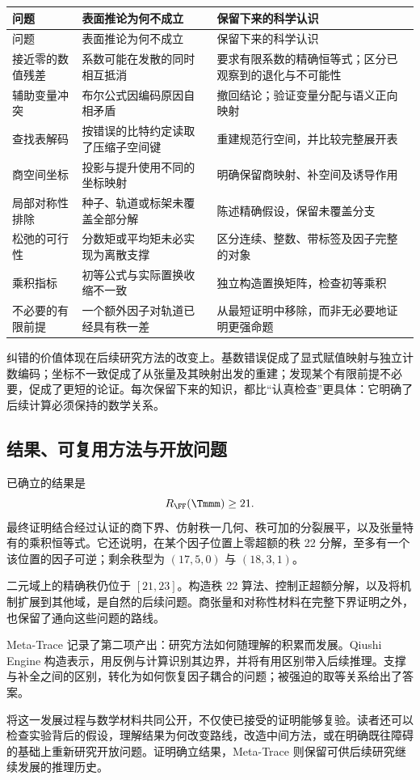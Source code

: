 \begin{longtable}{@{}L{3.3cm}L{5.1cm}L{5.8cm}@{}}
\toprule
问题&表面推论为何不成立&保留下来的科学认识\\
\midrule
\endfirsthead
\toprule 问题&表面推论为何不成立&保留下来的科学认识\\\midrule
\endhead
\bottomrule\endfoot
接近零的数值残差&系数可能在发散的同时相互抵消&要求有限系数的精确恒等式；区分已观察到的退化与不可能性\\
辅助变量冲突&布尔公式因编码原因自相矛盾&撤回结论；验证变量分配与语义正向映射\\
查找表解码&按错误的比特约定读取了压缩子空间键&重建规范行空间，并比较完整展开表\\
商空间坐标&投影与提升使用不同的坐标映射&明确保留商映射、补空间及诱导作用\\
局部对称性排除&种子、轨道或标架未覆盖全部分解&陈述精确假设，保留未覆盖分支\\
松弛的可行性&分数矩或平均矩未必实现为离散支撑&区分连续、整数、带标签及因子完整的对象\\
乘积指标&初等公式与实际置换收缩不一致&独立构造置换矩阵，检查初等乘积\\
不必要的有限前提&一个额外因子对轨道已经具有秩一差&从最短证明中移除，而非无必要地证明更强命题\\
\end{longtable}

纠错的价值体现在后续研究方法的改变上。基数错误促成了显式赋值映射与独立计数编码；坐标不一致促成了从张量及其映射出发的重建；发现某个有限前提不必要，促成了更短的论证。每次保留下来的知识，都比“认真检查”更具体：它明确了后续计算必须保持的数学关系。

\subsection{结果、可复用方法与开放问题}\label{route:outcome}

已确立的结果是
\[
 R_{\FF}(\Tmmm)\ge21.
\]
最终证明结合经过认证的商下界、仿射秩一几何、秩可加的分裂展平，以及张量特有的乘积恒等式。它还说明，在某个因子位置上零超额的秩 22 分解，至多有一个该位置的因子可逆；剩余秩型为 $(17,5,0)$ 与 $(18,3,1)$。

二元域上的精确秩仍位于 $[21,23]$。构造秩 22 算法、控制正超额分解，以及将机制扩展到其他域，是自然的后续问题。商张量和对称性材料在完整下界证明之外，也保留了通向这些问题的路线。

Meta-Trace 记录了第二项产出：研究方法如何随理解的积累而发展。Qiushi Engine 构造表示，用反例与计算识别其边界，并将有用区别带入后续推理。支撑与补全之间的区别，转化为如何恢复因子耦合的问题；被强迫的取等关系给出了答案。

将这一发展过程与数学材料共同公开，不仅使已接受的证明能够复验。读者还可以检查实验背后的假设，理解结果为何改变路线，改造中间方法，或在明确既往障碍的基础上重新研究开放问题。证明确立结果，Meta-Trace 则保留可供后续研究继续发展的推理历史。
